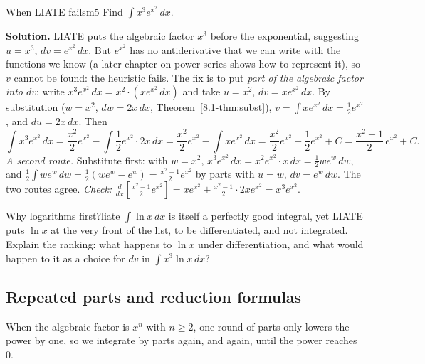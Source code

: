 \documentclass[11pt]{article}
\begin{document}
\begin{exmp}{When LIATE fails}{m5}
Find $\int x^3e^{x^2}\,dx$.

\textbf{Solution.} LIATE puts the algebraic factor $x^3$ before the exponential, suggesting $u=x^3$, $dv=e^{x^2}\,dx$. But $e^{x^2}$ has no antiderivative that we can write with the functions we know (a later chapter on power series shows how to represent it), so $v$ cannot be found: the heuristic fails. The fix is to put \emph{part of the algebraic factor into $dv$}: write $x^3e^{x^2}\,dx=x^2\cdot\left(xe^{x^2}\,dx\right)$ and take $u=x^2$, $dv=xe^{x^2}\,dx$. By substitution ($w=x^2$, $dw=2x\,dx$, Theorem~\ref{8.1-thm:subst}), $v=\int xe^{x^2}\,dx=\frac12e^{x^2}$, and $du=2x\,dx$. Then
\[\int x^3e^{x^2}\,dx=\frac{x^2}2e^{x^2}-\int\frac12e^{x^2}\cdot2x\,dx=\frac{x^2}2e^{x^2}-\int xe^{x^2}\,dx=\frac{x^2}2e^{x^2}-\frac12e^{x^2}+C=\frac{x^2-1}2\,e^{x^2}+C .\]
\emph{A second route.} Substitute first: with $w=x^2$, $x^3e^{x^2}\,dx=x^2e^{x^2}\cdot x\,dx=\frac12we^w\,dw$, and $\frac12\int we^w\,dw=\frac12\left(we^w-e^w\right)=\frac{x^2-1}2e^{x^2}$ by parts with $u=w$, $dv=e^w\,dw$. The two routes agree. \emph{Check:} $\frac{d}{dx}\left[\frac{x^2-1}2e^{x^2}\right]=xe^{x^2}+\frac{x^2-1}2\cdot2xe^{x^2}=x^3e^{x^2}$.
\end{exmp}

\begin{think}{Why logarithms first?}{liate}
$\int\ln x\,dx$ is itself a perfectly good integral, yet LIATE puts $\ln x$ at the very front of the list, to be differentiated, and not integrated. Explain the ranking: what happens to $\ln x$ under differentiation, and what would happen to it as a choice for $dv$ in $\int x^3\ln x\,dx$?
\end{think}

\subsection*{Repeated parts and reduction formulas}

When the algebraic factor is $x^n$ with $n\ge2$, one round of parts only lowers the power by one, so we integrate by parts again, and again, until the power reaches $0$.
\end{document}
